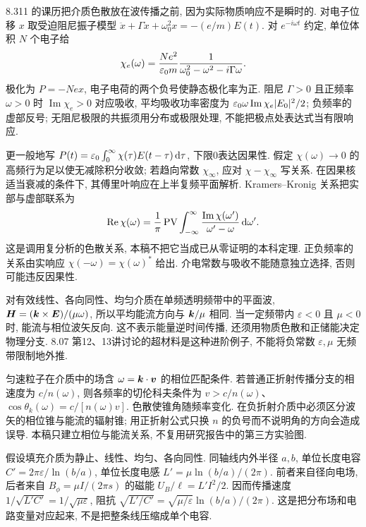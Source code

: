 8.311 的课历把介质色散放在波传播之前, 因为实际物质响应不是瞬时的. 对电子位移 $x$ 取受迫阻尼振子模型 $\ddot x+\Gamma\dot x+\omega_0^2x=-(e/m)E(t)$. 对 $e^{-i\omega t}$ 约定, 单位体积 $N$ 个电子给
\[
\chi_e(\omega)=\frac{Ne^2}{\varepsilon_0 m}\frac1{\omega_0^2-\omega^2-i\Gamma\omega}.
\]
极化为 $P=-Nex$, 电子电荷的两个负号使静态极化率为正. 阻尼 $\Gamma>0$ 且正频率 $\omega>0$ 时 $\operatorname{Im}\chi_e>0$ 对应吸收, 平均吸收功率密度为 $\varepsilon_0\omega\operatorname{Im}\chi_e|E_0|^2/2$; 负频率的虚部反号; 无阻尼极限的共振须用分布或极限处理, 不能把极点处表达式当有限响应.

更一般地写 $P(t)=\varepsilon_0\int_0^\infty\chi(\tau)E(t-\tau)\,\mathrm d\tau$, 下限0表达因果性. 假定 $\chi(\omega)\to0$ 的高频行为足以使无减除积分收敛; 若趋向常数 $\chi_\infty$, 应对 $\chi-\chi_\infty$ 写关系. 在因果核适当衰减的条件下, 其傅里叶响应在上半复频平面解析. Kramers--Kronig 关系把实部与虚部联系为
\[
\operatorname{Re}\chi(\omega)=\frac1\pi\operatorname{PV}\int_{-\infty}^\infty
\frac{\operatorname{Im}\chi(\omega')}{\omega'-\omega}\,\mathrm d\omega'.
\]
这是调用复分析的色散关系, 本稿不把它当成已从零证明的本科定理. 正负频率的关系由实响应 $\chi(-\omega)=\chi(\omega)^*$ 给出. 介电常数与吸收不能随意独立选择, 否则可能违反因果性.

对有效线性、各向同性、均匀介质在单频透明频带中的平面波, $\boldsymbol{H}=(\boldsymbol{k}\times\boldsymbol{E})/(\mu\omega)$, 所以平均能流方向与 $\boldsymbol{k}/\mu$ 相同. 当一定频带内 $\varepsilon<0$ 且 $\mu<0$ 时, 能流与相位波矢反向. 这不表示能量逆时间传播, 还须用物质色散和正储能决定物理分支. 8.07 第12、13讲讨论的超材料是这种进阶例子, 不能将负常数 $\varepsilon,\mu$ 无频带限制地外推.

匀速粒子在介质中的场含 $\omega=\boldsymbol{k}\cdot\boldsymbol{v}$ 的相位匹配条件. 若普通正折射传播分支的相速度为 $c/n(\omega)$, 则各频率的切伦科夫条件为 $v>c/n(\omega)$、$\cos\theta_k(\omega)=c/[n(\omega)v]$. 色散使锥角随频率变化. 在负折射介质中必须区分波矢的相位锥与能流的辐射锥; 用正折射公式只换 $n$ 的负号而不说明角的方向会造成误导. 本稿只建立相位与能流关系, 不复用研究报告中的第三方实验图.

假设填充介质为静止、线性、均匀、各向同性. 同轴线内外半径 $a,b$, 单位长度电容 $C'=2\pi\varepsilon/\ln(b/a)$, 单位长度电感 $L'=\mu\ln(b/a)/(2\pi)$. 前者来自径向电场, 后者来自 $B_\phi=\mu I/(2\pi s)$ 的磁能 $U_B/\ell=L'I^2/2$. 因而传播速度 $1/\sqrt{L'C'}=1/\sqrt{\mu\varepsilon}$, 阻抗 $\sqrt{L'/C'}=\sqrt{\mu/\varepsilon}\ln(b/a)/(2\pi)$. 这是把分布场和电路变量对应起来, 不是把整条线压缩成单个电容.

